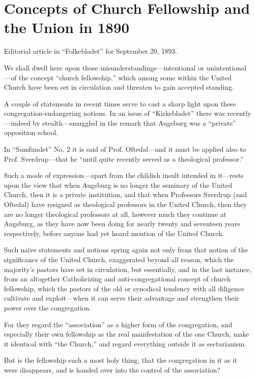 
\section{Concepts of Church Fellowship and the Union in 1890}

Editorial article in “Folkebladet” for September 20, 1893.

We shall dwell here upon those misunderstandings—intentional or unintentional—of the concept “church fellowship,” which among some within the United Church have been set in circulation and threaten to gain accepted standing.

A couple of statements in recent times serve to cast a sharp light upon these congregation-endangering notions. In an issue of “Kirkebladet” there was recently—indeed by stealth—smuggled in the remark that Augsburg was a “private” opposition school.

In “Samfundet” No. 2 it is said of Prof. Oftedal—and it must be applied also to Prof. Sverdrup—that he “until quite recently served as a theological professor.”

Such a mode of expression—apart from the childish insult intended in it—rests upon the view that when Augsburg is no longer the seminary of the United Church, then it is a private institution, and that when Professors Sverdrup (and Oftedal) have resigned as theological professors in the United Church, then they are no longer theological professors at all, however much they continue at Augsburg, as they have now been doing for nearly twenty and seventeen years respectively, before anyone had yet heard mention of the United Church.

Such naïve statements and notions spring again not only from that notion of the significance of the United Church, exaggerated beyond all reason, which the majority’s pastors have set in circulation, but essentially, and in the last instance, from an altogether Catholicizing and anti-congregational concept of church fellowship, which the pastors of the old or synodical tendency with all diligence cultivate and exploit—when it can serve their advantage and strengthen their power over the congregation.

For they regard the “association” as a higher form of the congregation, and especially their own fellowship as the real manifestation of the one Church, make it identical with “the Church,” and regard everything outside it as sectarianism.

But is the fellowship such a most holy thing, that the congregation in it as it were disappears, and is handed over into the control of the association?

